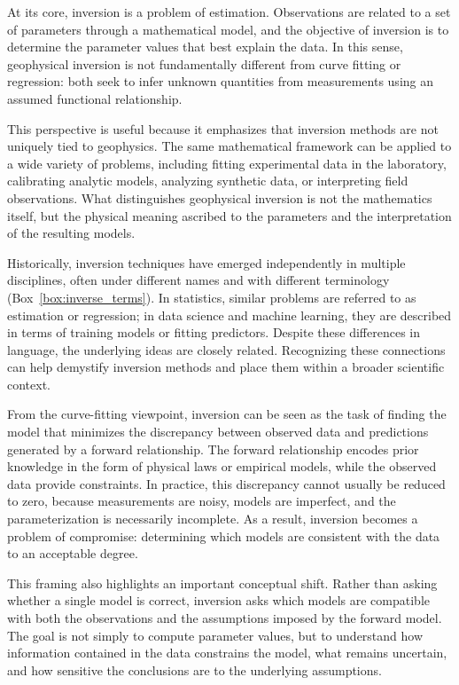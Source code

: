 At its core, inversion is a problem of estimation. Observations are related to a set of parameters through a mathematical model, and the objective of inversion is to determine the parameter values that best explain the data. In this sense, geophysical inversion is not fundamentally different from curve fitting or regression: both seek to infer unknown quantities from measurements using an assumed functional relationship.

This perspective is useful because it emphasizes that inversion methods are not uniquely tied to geophysics. The same mathematical framework can be applied to a wide variety of problems, including fitting experimental data in the laboratory, calibrating analytic models, analyzing synthetic data, or interpreting field observations. What distinguishes geophysical inversion is not the mathematics itself, but the physical meaning ascribed to the parameters and the interpretation of the resulting models.

Historically, inversion techniques have emerged independently in multiple disciplines, often under different names and with different terminology (Box~\ref{box:inverse_terms}). In statistics, similar problems are referred to as estimation or regression; in data science and machine learning, they are described in terms of training models or fitting predictors. Despite these differences in language, the underlying ideas are closely related. Recognizing these connections can help demystify inversion methods and place them within a broader scientific context.

From the curve-fitting viewpoint, inversion can be seen as the task of finding the model that minimizes the discrepancy between observed data and predictions generated by a forward relationship. The forward relationship encodes prior knowledge in the form of physical laws or empirical models, while the observed data provide constraints. In practice, this discrepancy cannot usually be reduced to zero, because measurements are noisy, models are imperfect, and the parameterization is necessarily incomplete. As a result, inversion becomes a problem of compromise: determining which models are consistent with the data to an acceptable degree.

This framing also highlights an important conceptual shift. Rather than asking whether a single model is correct, inversion asks which models are compatible with both the observations and the assumptions imposed by the forward model. The goal is not simply to compute parameter values, but to understand how information contained in the data constrains the model, what remains uncertain, and how sensitive the conclusions are to the underlying assumptions.

